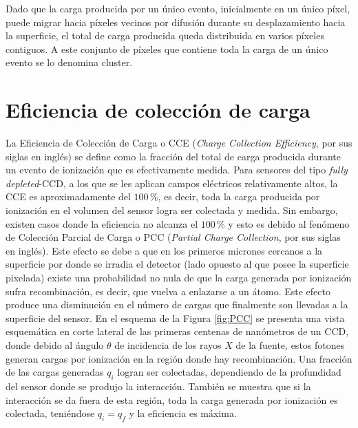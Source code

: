 Dado que la carga producida por un único evento, inicialmente en un único píxel, puede migrar hacia píxeles vecinos por difusión durante su desplazamiento hacia la superficie, el total de carga producida queda distribuida en varios píxeles contiguos. A este conjunto de píxeles que contiene toda la carga de un único evento se lo denomina cluster.
\section{Eficiencia de colección de carga}
\noindent La Eficiencia de Colección de Carga o CCE (\textit{Charge Collection Efficiency}, por sus siglas en inglés) se define como la fracción del total de carga producida durante un evento de ionización que es efectivamente medida. 
Para sensores del tipo \textit{fully depleted}-CCD\cite{osti_838066}, a los que se les aplican campos eléctricos relativamente altos, la CCE es aproximadamente del $100\,\%$, es decir, toda la carga producida por ionización en el volumen del sensor logra ser colectada y medida. 
Sin embargo, existen casos donde la eficiencia no alcanza el $100\,\%$ y esto es debido al fenómeno de Colección Parcial de Carga o PCC (\textit{Partial Charge Collection}, por sus siglas en inglés)\cite{PCC-CCE}. 
Este efecto se debe a que en los primeros micrones cercanos a la superficie por donde se irradia el detector (lado opuesto al que posee la superficie pixelada) existe una probabilidad no nula de que la carga generada por ionización sufra recombinación, es decir, que vuelva a enlazarse a un átomo. Este efecto produce una disminución en el número de cargas que finalmente son llevadas a la superficie del sensor. 
En el esquema de la Figura \ref{fig:PCC} se presenta una vista esquemática en corte lateral de las primeras centenas de nanómetros de un CCD, donde debido al ángulo $\theta$ de incidencia de los rayos $X$ de la fuente, estos fotones generan cargas por ionización en la región donde hay recombinación. Una fracción de las cargas generadas $q_{i}$ logran ser colectadas, dependiendo de la profundidad del sensor donde se produjo la interacción. También se muestra que si la interacción se da fuera de esta región, toda la carga generada por ionización es colectada, teniéndose $q_{i} = q_{f}$ y la eficiencia es máxima.
